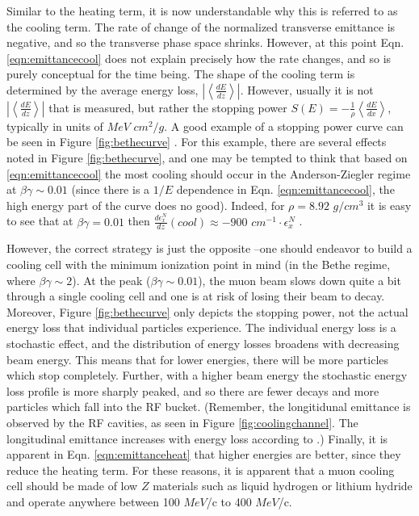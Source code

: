 Similar to the heating term, it is now understandable why this is referred to as the cooling term. The rate of change of the normalized transverse emittance is negative, and so the transverse phase space shrinks. However, at this point Eqn. \ref{eqn:emittancecool} does not explain precisely how the rate changes, and so is purely conceptual for the time being. The shape of the cooling term is determined by the average energy loss, $\left|\left<\frac{dE}{dz}\right>\right|$. However, usually it is not $\left|\left<\frac{dE}{dz}\right>\right|$ that is measured, but rather the stopping power $S(E)=-\frac{1}{\rho}\left<\frac{dE}{dx}\right>$, typically in units of $MeV$ $cm^2/g$. A good example of a stopping power curve can be seen in Figure \ref{fig:bethecurve} \cite{PDG}. For this example, there are several effects noted in Figure \ref{fig:bethecurve}, and one may be tempted to think that based on \ref{eqn:emittancecool} the most cooling should occur in the Anderson-Ziegler regime at $\beta\gamma\sim0.01$ (since there is a $1/E$ dependence in Eqn. \ref{eqn:emittancecool}, the high energy part of the curve does no good). Indeed, for $\rho= 8.92$ $g/cm^3$ it is easy to see that at $\beta\gamma=0.01$ then $\frac{d\epsilon_x^N}{dz}(cool)\approx-900$  $cm^{-1} \cdot \epsilon_x^N$ .

However, the correct strategy is just the opposite --one should endeavor to build a cooling cell with the minimum ionization point in mind (in the Bethe regime, where $\beta\gamma\sim2$). At the peak ($\beta\gamma\sim0.01$), the muon beam slows down quite a bit through a single cooling cell and one is at risk of losing their beam to decay. Moreover, Figure \ref{fig:bethecurve} only depicts the stopping power, not the actual energy loss that individual particles experience. The individual energy loss is a stochastic effect, and the distribution of energy losses broadens with decreasing beam energy. This means that for lower energies, there will be more particles which stop completely. Further, with a higher beam energy the stochastic energy loss profile is more sharply peaked, and so there are fewer decays and more particles which fall into the RF bucket. (Remember, the longitidunal emittance is observed by the RF cavities, as seen in Figure \ref{fig:coolingchannel}. The longitudinal emittance increases with energy loss according to \cite{Fernow}.) Finally, it is apparent in Eqn. \ref{eqn:emittanceheat} that higher energies are better, since they reduce the heating term. For these reasons, it is apparent that a muon cooling cell should be made of low $Z$ materials such as liquid hydrogen or lithium hydride and operate anywhere between 100 $MeV$/c to 400 $MeV$/c.

